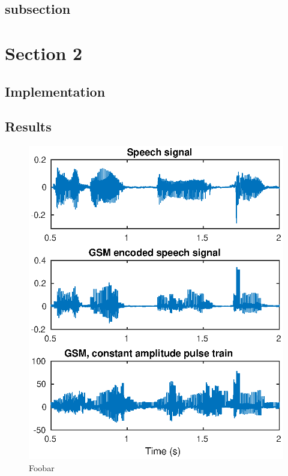 \documentclass[conference]{IEEEtran}
\begin{document}
\subsection{subsection}
\blindtext

\section{Section 2}

\subsection{Implementation}
\blindtext


\subsection{Results}

\begin{figure}
  \centering
  \includegraphics[width=\linewidth]{images/example.eps}
  \caption{Foobar}
  \label{fig:fig-label-1}
\end{figure}
\end{document}
